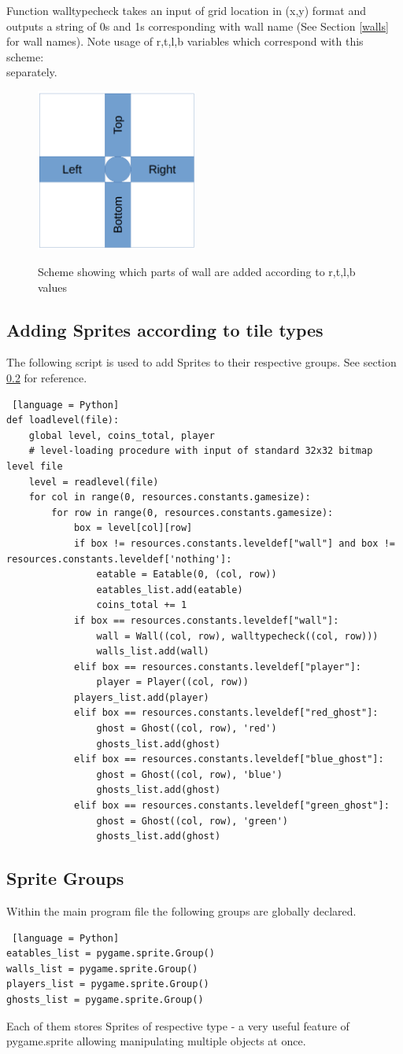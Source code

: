 \documentclass[11pt,a4paper]{report}
\newcommand{\dsubsection}[1]{\FloatBarrier \subsection{#1}}
\newenvironment{img}{
	\begin{center}
		\begin{figure}[H]
			\begin{center}
			
}{
	\end{center}
		\end{figure}
			\end{center}
}
\begin{document}
				Function walltypecheck takes an input of grid location in (x,y) format and outputs a string of 0s and 1s corresponding with wall name (See Section \ref{walls} for wall names). Note usage of r,t,l,b variables which correspond with this scheme:\\
				separately.
				\begin{img}
					\includegraphics[width = 150pt]{images/rtlb}\\
					\caption{Scheme showing which parts of wall are added according to r,t,l,b values}
				\end{img}
				
			\dsubsection{Adding Sprites according to tile types}
				The following script is used to add Sprites to their respective groups. See section \ref{sprite-groups} for reference.
\begin{lstlisting} [language = Python]
def loadlevel(file):
	global level, coins_total, player
	# level-loading procedure with input of standard 32x32 bitmap level file
	level = readlevel(file)
	for col in range(0, resources.constants.gamesize):
		for row in range(0, resources.constants.gamesize):
			box = level[col][row]
			if box != resources.constants.leveldef["wall"] and box != resources.constants.leveldef['nothing']:
				eatable = Eatable(0, (col, row))
				eatables_list.add(eatable)
				coins_total += 1
			if box == resources.constants.leveldef["wall"]:
				wall = Wall((col, row), walltypecheck((col, row)))
				walls_list.add(wall)
			elif box == resources.constants.leveldef["player"]:
				player = Player((col, row))
			players_list.add(player)
			elif box == resources.constants.leveldef["red_ghost"]:
				ghost = Ghost((col, row), 'red')
				ghosts_list.add(ghost)
			elif box == resources.constants.leveldef["blue_ghost"]:
				ghost = Ghost((col, row), 'blue')
				ghosts_list.add(ghost)
			elif box == resources.constants.leveldef["green_ghost"]:
				ghost = Ghost((col, row), 'green')
				ghosts_list.add(ghost)
\end{lstlisting}
			\dsubsection{Sprite Groups}
				\label{sprite-groups}
				Within the main program file the following groups are globally declared.
\begin{lstlisting} [language = Python]
eatables_list = pygame.sprite.Group()
walls_list = pygame.sprite.Group()
players_list = pygame.sprite.Group()
ghosts_list = pygame.sprite.Group()
\end{lstlisting}
				Each of them stores Sprites of respective type - a very useful feature of pygame.sprite allowing manipulating multiple objects at once.
\end{document}
